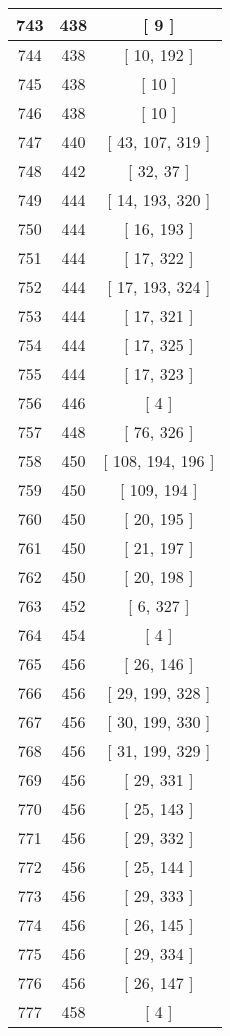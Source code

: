 \begin{center}
\begin{longtable}[H]{|| c c c ||}
\hline
743 & 438 & [ 9 ] \\ 
\hline
744 & 438 & [ 10, 192 ] \\ 
\hline
745 & 438 & [ 10 ] \\ 
\hline
746 & 438 & [ 10 ] \\ 
\hline
747 & 440 & [ 43, 107, 319 ] \\ 
\hline
748 & 442 & [ 32, 37 ] \\ 
\hline
749 & 444 & [ 14, 193, 320 ] \\ 
\hline
750 & 444 & [ 16, 193 ] \\ 
\hline
751 & 444 & [ 17, 322 ] \\ 
\hline
752 & 444 & [ 17, 193, 324 ] \\ 
\hline
753 & 444 & [ 17, 321 ] \\ 
\hline
754 & 444 & [ 17, 325 ] \\ 
\hline
755 & 444 & [ 17, 323 ] \\ 
\hline
756 & 446 & [ 4 ] \\ 
\hline
757 & 448 & [ 76, 326 ] \\ 
\hline
758 & 450 & [ 108, 194, 196 ] \\ 
\hline
759 & 450 & [ 109, 194 ] \\ 
\hline
760 & 450 & [ 20, 195 ] \\ 
\hline
761 & 450 & [ 21, 197 ] \\ 
\hline
762 & 450 & [ 20, 198 ] \\ 
\hline
763 & 452 & [ 6, 327 ] \\ 
\hline
764 & 454 & [ 4 ] \\ 
\hline
765 & 456 & [ 26, 146 ] \\ 
\hline
766 & 456 & [ 29, 199, 328 ] \\ 
\hline
767 & 456 & [ 30, 199, 330 ] \\ 
\hline
768 & 456 & [ 31, 199, 329 ] \\ 
\hline
769 & 456 & [ 29, 331 ] \\ 
\hline
770 & 456 & [ 25, 143 ] \\ 
\hline
771 & 456 & [ 29, 332 ] \\ 
\hline
772 & 456 & [ 25, 144 ] \\ 
\hline
773 & 456 & [ 29, 333 ] \\ 
\hline
774 & 456 & [ 26, 145 ] \\ 
\hline
775 & 456 & [ 29, 334 ] \\ 
\hline
776 & 456 & [ 26, 147 ] \\ 
\hline
777 & 458 & [ 4 ] \\ 

\end{longtable}
\end{center}
